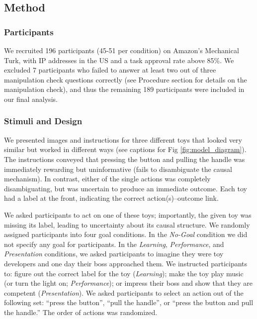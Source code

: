 \documentclass[10pt, letterpaper]{article}
\begin{document}
\subsection{Method}\label{method}

\subsubsection{Participants}\label{participants}

We recruited 196 participants (45-51 per condition) on Amazon's
Mechanical Turk, with IP addresses in the US and a task approval rate
above 85\%. We excluded 7 participants who failed to answer at least two
out of three manipulation check questions correctly (see Procedure
section for details on the manipulation check), and thus the remaining
189 participants were included in our final analysis.

\subsubsection{Stimuli and Design}\label{stimuli-and-design}

We presented images and instructions for three different toys that
looked very similar but worked in different ways (see captions for Fig
\ref{fig:model_diagram}). The instructions conveyed that pressing the
button and pulling the handle was immediately rewarding but
uninformative (fails to disambiguate the causal mechanism). In contrast,
either of the single actions was completely disambiguating, but was
uncertain to produce an immediate outcome. Each toy had a label at the
front, indicating the correct action(s)--outcome link.

We asked participants to act on one of these toys; importantly, the
given toy was missing its label, leading to uncertainty about its causal
structure. We randomly assigned participants into four goal conditions.
In the \emph{No-Goal} condition we did not specify any goal for
participants. In the \emph{Learning}, \emph{Performance}, and
\emph{Presentation} conditions, we asked participants to imagine they
were toy developers and one day their boss approached them. We
instructed participants to: figure out the correct label for the toy
(\emph{Learning}); make the toy play music (or turn the light on;
\emph{Performance}); or impress their boss and show that they are
competent (\emph{Presentation}). We asked participants to select an
action out of the following set: ``press the button'', ``pull the
handle'', or ``press the button and pull the handle.'' The order of
actions was randomized.
\end{document}
